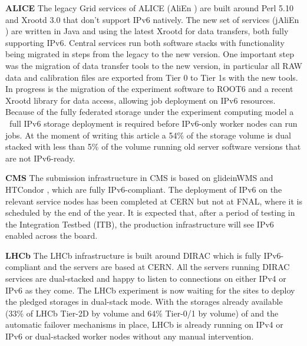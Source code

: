 \textbf{ALICE}
The legacy Grid services of ALICE (AliEn \cite{alien}) are built around Perl 5.10 and Xrootd 3.0 that don’t support IPv6 natively. The new set of services (jAliEn \cite{jalien}) are written in Java and using the latest Xrootd for data transfers, both fully supporting IPv6. Central services run both software stacks with functionality being migrated in steps from the legacy to the new version. One important step was the migration of data transfer tools to the new version, in particular all RAW data and calibration files are exported from Tier 0 to Tier 1s with the new tools. In progress is the migration of the experiment software to ROOT6 and a recent Xrootd library for data access, allowing job deployment on IPv6 resources.
Because of the fully federated storage under the experiment computing model a ~full IPv6 storage deployment is required before IPv6-only worker nodes can run jobs. At the moment of writing this article a 54\% of the storage volume is dual stacked with less than 5\% of the volume running old server software versions that are not IPv6-ready.



\textbf{CMS}
The submission infrastructure in CMS is based on glideinWMS \cite{glideinwms} and HTCondor \cite{htcondor}, which are fully IPv6-compliant. The deployment of IPv6 on the relevant service nodes has been completed at CERN but not at FNAL, where it is scheduled by the end of the year. It is expected that, after a period of testing in the Integration Testbed (ITB), the production infrastructure will see IPv6 enabled across the board.

\textbf{LHCb}
The LHCb infrastructure is built around DIRAC \cite{dirac} which is fully IPv6-compliant and the servers are based at CERN. All the servers running DIRAC services are dual-stacked and happy to listen to connections on either IPv4 or IPv6 as they come. The LHCb experiment is now waiting for the sites to deploy the pledged storages in dual-stack mode. With the storages already available (33\% of LHCb Tier-2D by volume and 64\% Tier-0/1 by volume) of  and the automatic failover mechanisms in place, LHCb is already running on IPv4 or IPv6 or dual-stacked worker nodes without any manual intervention.
